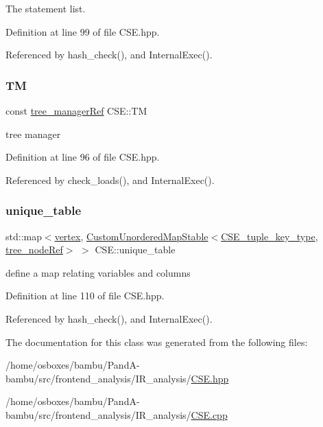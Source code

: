 The statement list. 



Definition at line 99 of file C\+S\+E.\+hpp.



Referenced by hash\+\_\+check(), and Internal\+Exec().

\mbox{\label{classCSE_a07193f5f92e5a2c8eebb6d459cf192c1}} 
\subsubsection{\texorpdfstring{TM}{TM}}
{\footnotesize\ttfamily const \hyperlink{tree__manager_8hpp_a96ff150c071ce11a9a7a1e40590f205e}{tree\+\_\+manager\+Ref} C\+S\+E\+::\+TM\hspace{0.3cm}{\ttfamily [private]}}



tree manager 



Definition at line 96 of file C\+S\+E.\+hpp.



Referenced by check\+\_\+loads(), and Internal\+Exec().

\mbox{\label{classCSE_a4188552ee310686996e4d3cacf837125}} 
\subsubsection{\texorpdfstring{unique\+\_\+table}{unique\_table}}
{\footnotesize\ttfamily std\+::map$<$\hyperlink{graph_8hpp_abefdcf0544e601805af44eca032cca14}{vertex}, \hyperlink{custom__map_8hpp_a7314a7df1cdb3a3acf478ab86e95c226}{Custom\+Unordered\+Map\+Stable}$<$\hyperlink{classCSE_a541f4bbb7540d84d1ed98f9c44b74417}{C\+S\+E\+\_\+tuple\+\_\+key\+\_\+type}, \hyperlink{tree__node_8hpp_a6ee377554d1c4871ad66a337eaa67fd5}{tree\+\_\+node\+Ref}$>$ $>$ C\+S\+E\+::unique\+\_\+table\hspace{0.3cm}{\ttfamily [private]}}



define a map relating variables and columns 



Definition at line 110 of file C\+S\+E.\+hpp.



Referenced by hash\+\_\+check(), and Internal\+Exec().



The documentation for this class was generated from the following files\+:\begin{DoxyCompactItemize}
\item 
/home/osboxes/bambu/\+Pand\+A-\/bambu/src/frontend\+\_\+analysis/\+I\+R\+\_\+analysis/\hyperlink{CSE_8hpp}{C\+S\+E.\+hpp}\item 
/home/osboxes/bambu/\+Pand\+A-\/bambu/src/frontend\+\_\+analysis/\+I\+R\+\_\+analysis/\hyperlink{CSE_8cpp}{C\+S\+E.\+cpp}\end{DoxyCompactItemize}
